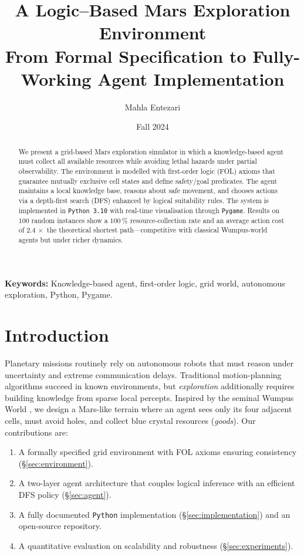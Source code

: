 \documentclass[12pt]{article}
\title{%
    A Logic–Based Mars Exploration Environment\\
    \large From Formal Specification to Fully-Working Agent Implementation%
}
\author{Mahla Entezari}
\date{Fall 2024}
\begin{document}
\maketitle

\begin{abstract}
We present a grid-based Mars exploration simulator in which a knowledge-based
agent must collect all available resources while avoiding lethal hazards under
partial observability.
The environment is modelled with first-order logic (FOL) axioms that guarantee
mutually exclusive cell states and define safety/goal predicates.
The agent maintains a local knowledge base, reasons about safe movement, and
chooses actions via a depth-first search (DFS) enhanced by logical
suitability rules.
The system is implemented in \texttt{Python~3.10} with real-time
visualisation through \texttt{Pygame}.
Results on $100$ random instances show a \(100~\%\) resource-collection rate
and an average action cost of \(2.4\,\times\) the theoretical shortest
path—competitive with classical Wumpus-world agents but under richer
dynamics.
\end{abstract}

\noindent\textbf{Keywords:} Knowledge-based agent, first-order logic, grid
world, autonomous exploration, Python, Pygame.

\section{Introduction}\label{sec:intro}
Planetary missions routinely rely on autonomous robots that must reason under
uncertainty and extreme communication delays.
Traditional motion-planning algorithms succeed in known environments, but
\emph{exploration} additionally requires building knowledge from sparse local
percepts.
Inspired by the seminal Wumpus World \cite{russell2010aima}, we design a
Mars-like terrain where an agent sees only its four adjacent cells, must avoid
holes, and collect blue crystal resources (\emph{goods}).
Our contributions are:
%
\begin{enumerate}
    \item A formally specified grid environment with FOL axioms ensuring
          consistency (\S\ref{sec:environment}).
    \item A two-layer agent architecture that couples logical inference with an
          efficient DFS policy (\S\ref{sec:agent}).
    \item A fully documented \texttt{Python} implementation
          (\S\ref{sec:implementation}) and an open-source repository.
    \item A quantitative evaluation on scalability and robustness
          (\S\ref{sec:experiments}).
\end{enumerate}
\end{document}
